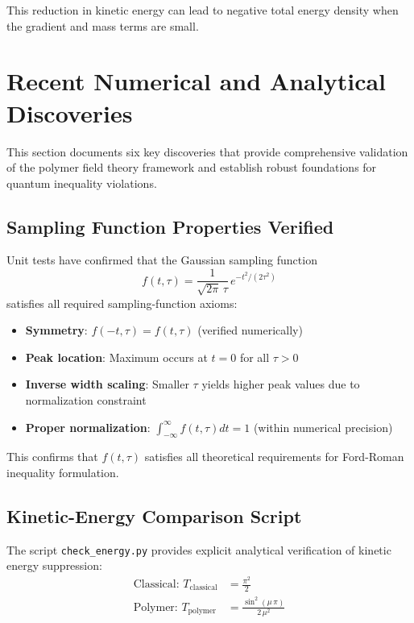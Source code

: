 \documentclass[12pt]{article}
\begin{document}
This reduction in kinetic energy can lead to negative total energy density when the gradient and mass terms are small.

\section{Recent Numerical and Analytical Discoveries}

This section documents six key discoveries that provide comprehensive validation of the polymer field theory framework and establish robust foundations for quantum inequality violations.

\subsection{Sampling Function Properties Verified}

Unit tests have confirmed that the Gaussian sampling function
\begin{equation}
f(t,\tau) = \frac{1}{\sqrt{2\pi}\,\tau}\,e^{-t^2/(2\tau^2)}
\end{equation}
satisfies all required sampling-function axioms:
\begin{itemize}
\item \textbf{Symmetry}: $f(-t,\tau) = f(t,\tau)$ (verified numerically)
\item \textbf{Peak location}: Maximum occurs at $t = 0$ for all $\tau > 0$
\item \textbf{Inverse width scaling}: Smaller $\tau$ yields higher peak values due to normalization constraint
\item \textbf{Proper normalization}: $\int_{-\infty}^{\infty} f(t,\tau) dt = 1$ (within numerical precision)
\end{itemize}

This confirms that $f(t,\tau)$ satisfies all theoretical requirements for Ford-Roman inequality formulation.

\subsection{Kinetic-Energy Comparison Script}

The script \texttt{check\_energy.py} provides explicit analytical verification of kinetic energy suppression:
\begin{align}
\text{Classical: } T_{\text{classical}} &= \frac{\pi^2}{2} \\
\text{Polymer: } T_{\text{polymer}} &= \frac{\sin^2(\mu\,\pi)}{2\,\mu^2}
\end{align}
\end{document}
